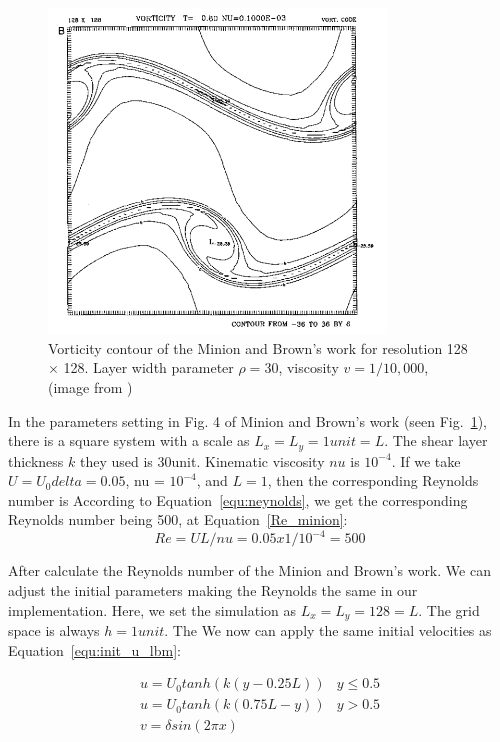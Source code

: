 \begin{figure}[!tb]
   \centering
       \includegraphics[width=0.8\textwidth]{figures/minion.png}
       \caption{Vorticity contour of the Minion and Brown's work for resolution 128 $\times$ 128. Layer width parameter $\rho = 30$, viscosity $v=1/10,000$, (image from \cite{minion1997performance})}
       \label{fig:minion}
\end{figure}
In the parameters setting in Fig. 4 of Minion and Brown's work (seen Fig.~\ref{fig:minion}), there is a square system with a scale as $L_x = L_y = 1 unit = L$. The shear layer thickness $k$ they used is 30unit. Kinematic viscosity $nu$ is $10^{-4}$. If we take $U = U_0 delta = 0.05$, nu = $10^{-4}$, and $L = 1$, then the corresponding Reynolds number is According to Equation~\ref{equ:neynolds}, we get the corresponding Reynolds number being 500, at Equation~\ref{Re_minion}:
\begin{equation}
\label{Re_minion}
    Re = UL / nu = 0.05 x 1 / 10^{-4} = 500
\end{equation}

After calculate the Reynolds number of the Minion and Brown's work. We can adjust the initial parameters making the Reynolds the same in our implementation. Here, we set the simulation as $L_x = L_y = 128 = L$. The grid space is always $h = 1 unit$. The We now can apply the same initial velocities as Equation~\ref{equ:init_u_lbm}:

\begin{equation}
\label{equ:init_u_lbm}
    \begin{matrix}
u = U_0tanh(k (y-0.25L)) & y \leqslant 0.5 \\ 
u = U_0tanh(k (0.75L-y)) & y > 0.5  \\
v = \delta sin(2\pi x )
\end{matrix}
\end{equation}

